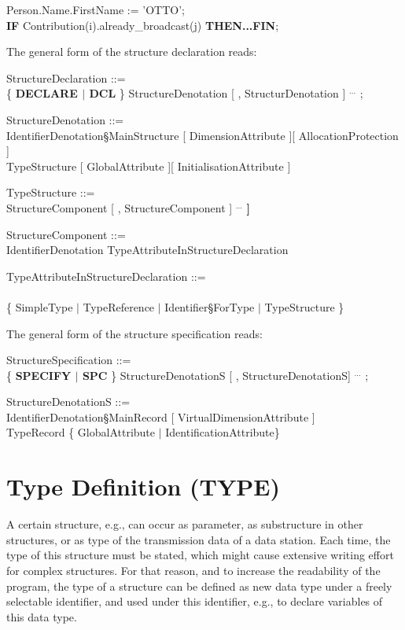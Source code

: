 Person.Name.FirstName := 'OTTO';\\
{\bf IF} Contribution(i).already\_broadcast(j) {\bf THEN...FIN};

The general form of the structure declaration reads:

StructureDeclaration ::=\\
\x \{ {\bf DECLARE $\mid$ DCL} \} StructureDenotation [ , StructurDenotation ] $^{...}$ ;

StructureDenotation ::=\\
\x IdentifierDenotation\S MainStructure [ DimensionAttribute ][ AllocationProtection ]\\
\x TypeStructure [ GlobalAttribute ][ InitialisationAttribute ]

TypeStructure ::=\\
\x {\bf STRUCT [} StructureComponent [ , StructureComponent ] $^{...}$ {\bf ]}

StructureComponent ::=\\
\x IdentifierDenotation TypeAttributeInStructureDeclaration

TypeAttributeInStructureDeclaration ::=\\
\x [ DimensionAttribute ] \\
\x \{ SimpleType $\mid$ TypeReference $\mid$ Identifier\S ForType $\mid$ TypeStructure \}

The general form of the structure specification reads:

StructureSpecification ::=\\
\x \{ {\bf SPECIFY $\mid$ SPC} \} StructureDenotationS [ , StructureDenotationS] $^{...}$ ;

StructureDenotationS ::=\\
\x IdentifierDenotation\S MainRecord [ VirtualDimensionAttribute ]\\
\x [ AllocationProtection ] TypeRecord \{ GlobalAttribute $\mid$ IdentificationAttribute\}


\section{Type Definition (TYPE)} %

A certain structure, e.g., can occur as parameter, as substructure in other
structures, or as type of the transmission data of a data station.  Each
time, the type of this structure must be stated, which might cause
extensive writing effort for complex structures. For that reason, and to
increase the readability of the program, the type of a structure can be
defined as new data type under a freely selectable identifier, and used
under this identifier, e.g., to declare variables of this data type.


